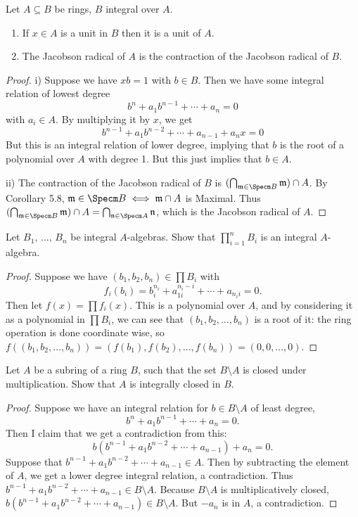 \begin{exercise}
	Let $A \subseteq B$ be rings, $B$ integral over $A$.
	\begin{enumerate}
		\item If $x \in A$ is a unit in $B$ then it is a unit of $A$.
		\item The Jacobson radical of $A$ is the contraction of the Jacobson radical of $B$.
\end{enumerate}
\end{exercise}
\begin{proof}
	i) Suppose we have $xb = 1 $ with $b \in B $.
	Then we have some integral relation of lowest degree
	\[
		b^n + a_1 b^{n-1} + \cdots + a_n = 0
	\] 
	with $a_i \in A $.
	By multiplying it by $x $, we get
	\[
		b^{n-1} + a_1 b^{n-2} + \cdots + a_{n-1} + a_nx = 0
	\] 
	But this is an integral relation of lower degree, implying that $b $ is the root of a polynomial over $A $ with degree 1.
	But this just implies that $b \in A $.

	ii) The contraction of the Jacobson radical of $B $ is $(\bigcap_{\mathfrak{m}\in\Specm B} \mathfrak{m}) \cap A $.
	By Corollary 5.8, $\mathfrak{m} \in \Specm B \iff \mathfrak{m}\cap A $ is Maximal.
	Thus $(\bigcap_{\mathfrak{m}\in \Specm B} \mathfrak{m})\cap A = \bigcap_{\mathfrak{n}\in\Specm A} \mathfrak{n}$, which is the Jacobson radical of $A $.
\end{proof}

\begin{exercise}
	Let $B_1,\,\ldots,\,B_n$ be integral $A$-algebras. Show that $\prod_{i=1}^n B_i$ is an integral $A$-algebra.
\end{exercise}
\begin{proof}
	Suppose we have $(b_{1},b_{2},b_n) \in \prod B_i $ with
	\[
		f_{i}(b_{i}) = b_{i}^{n_i} + a_{1i}^{n_i-i} + \cdots + a_{n_ii} = 0.
	\]
	Then let $f(x) = \prod f_i(x)$.
	This is a polynomial over $A $, and by considering it as a polynomial in $\prod B_i$, we can see that $(b_{1},b_{2}, \ldots, b_n) $ is a root of it: the ring operation is done coordinate wise, so $f((b_{1},b_{2},\ldots,b_n)) = (f(b_{1}),f(b_{2}),\ldots,f(b_n)) = (0,0,\ldots,0) $.
\end{proof}

\begin{exercise}
	Let $A$ be a subring of a ring $B$, such that the set $B \setminus A$ is closed under multiplication. Show that $A$ is integrally closed in $B$.
\end{exercise}
\begin{proof}
	Suppose we have an integral relation for $b \in B \setminus A$ of least degree,
	\[
		b^n + a_1 b^{n-1} + \cdots + a_n = 0
	.\] 
	Then I claim that we get a contradiction from this:
	\[
		b(b^{n-1} + a_1 b^{n-2} + \cdots + a_{n-1}) + a_n = 0
	.\] 
	Suppose that $b^{n-1} + a_1 b^{n-2} + \cdots + a_{n-1} \in A$.
	Then by subtracting the element of $A $, we get a lower degree integral relation, a contradiction.
	Thus $b^{n-1} + a_1 b^{n-2} + \cdots + a_{n-1} \in B \setminus A$.
	Because $B\setminus A $ is multiplicatively closed, $b(b^{n-1} + a_1 b^{n-2} + \cdots + a_{n-1}) \in B \setminus A $.
	But $-a_n $ is in $A $, a contradiction.
\end{proof}


